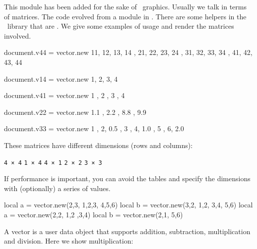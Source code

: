\stopsubsection

\usemodule[matrix]

\startsubsection[title=Vector]


This module has been added for the sake of \METAPOST\ graphics. Usually we talk
in terms of matrices. The code evolved from a module in \CONTEXT. There are some
helpers in the \METAPOST\ library that are . We give some
examples of usage and render the matrices involved.


\startbuffer
\startluacode
document.v44 = vector.new {
    { 11, 12, 13, 14 },
    { 21, 22, 23, 24 },
    { 31, 32, 33, 34 },
    { 41, 42, 43, 44 }
}

document.v14 = vector.new {
    { 1, 2, 3, 4 }
}

document.v41 = vector.new {
    { 1 }, { 2 }, { 3 }, { 4 }
}

document.v22 = vector.new {
    { 1.1 , 2.2 },
    { 8.8 , 9.9 }
}

document.v33 = vector.new {
    { 1 , 2, 0.5 },
    { 3 , 4, 1.0 },
    { 5 , 6, 2.0 }
}
\stopluacode
\stopbuffer

\typebuffer[option=TEX] \getbuffer

These matrices have different dimensions (rows and columns):

\startlinecorrection
{} {\hbox{\tt 4 × 4}}
    {} {\hbox{\tt 1 × 4}}
    {} {\hbox{\tt 4 × 1}}
    {} {\hbox{\tt 2 × 2}}
    {} {\hbox{\tt 3 × 3}}
\stopcombination
\stoplinecorrection

If performance is important, you can avoid the tables and specify the dimensions
with (optionally) a series of values.

\starttyping
local a = vector.new(2,3, 1,2,3, 4,5,6)
local b = vector.new(3,2, 1,2, 3,4, 5,6)
local a = vector.new(2,2, 1,2 ,3,4)
local b = vector.new(2,1, 5,6)
\stoptyping

A vector is a user data object that supports addition, subtraction,
multiplication and division. Here we show multiplication:


